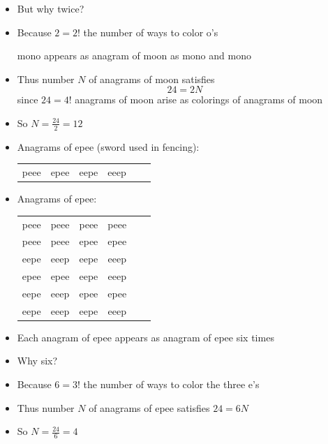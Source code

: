 \documentclass{beamer}
\theoremstyle{definition}
\begin{document}
\begin{frame}
\begin{itemize}
\item But why twice?
\item Because $2=2!$ the number of ways to color o's
\begin{example} mono appears as anagram of mo\alert{o}n
as mon\alert{o} and m\alert{o}no
\end{example}
\item Thus number $N$ of anagrams of moon satisfies
\[24=2N\]
since $24=4!$ anagrams of mo\alert{o}n arise as colorings of
anagrams of moon
\item So $N=\frac{24}{2}=12$
\end{itemize}
\end{frame}

\begin{frame}
\begin{itemize}
\item Anagrams of epee (sword used in fencing):\\
\begin{tabular}{cccccc}
peee&epee&eepe&eeep
\end{tabular}
\item Anagrams of ep{\color{red}e}{\color{blue}e}:\\
\begin{tabular}{cccccc}
pe{\color{red}e}{\color{blue}e}&pe{\color{blue}e}{\color{red}e}&p{\color{red}e}e{\color{blue}e}&p{\color{red}e}{\color{blue}e}e\\
p{\color{blue}e}e{\color{red}e}&p{\color{blue}e}{\color{red}e}e&ep{\color{red}e}{\color{blue}e}&ep{\color{blue}e}{\color{red}e}\\
e{\color{red}e}p{\color{blue}e}&e{\color{red}e}{\color{blue}e}p&e{\color{blue}e}p{\color{red}e}&e{\color{blue}e}{\color{red}e}p\\
{\color{red}e}pe{\color{blue}e}&{\color{red}e}p{\color{blue}e}e&{\color{red}e}ep{\color{blue}e}&{\color{red}e}e{\color{blue}e}p\\
{\color{red}e}{\color{blue}e}pe&{\color{red}e}{\color{blue}e}ep&{\color{blue}e}pe{\color{red}e}&{\color{blue}e}p{\color{red}e}e\\
{\color{blue}e}ep{\color{red}e}&{\color{blue}e}e{\color{red}e}p&{\color{blue}e}{\color{red}e}pe&{\color{blue}e}{\color{red}e}ep
\end{tabular}
\item Each anagram of epee appears as anagram of
ep{\color{red}e}{\color{blue}e}
\alert{six} times
\item Why six?
\item Because $6=3!$ the number of ways to color the three e's
\item Thus number $N$ of anagrams of epee satisfies $24=6N$
\item So $N=\frac{24}{6}=4$
\end{itemize}
\end{frame}
\end{document}
